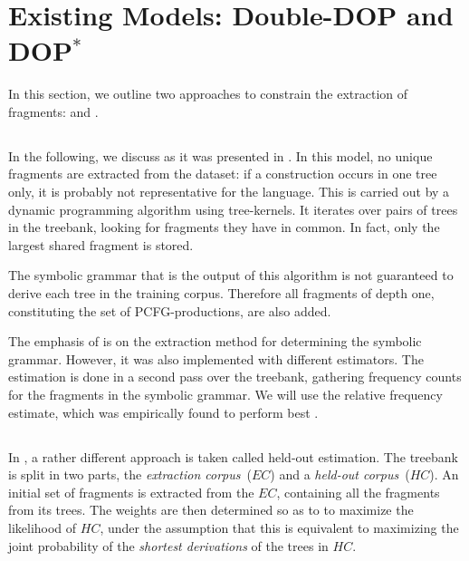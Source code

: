 
\section{Existing Models: Double-DOP and DOP$^*$}\label{sec:Existing}


In this section, we outline two approaches to constrain the extraction of fragments: \ddop{} and \dops{}. 

\subsection{\ddop}
In the following, we discuss \ddop{} as it was presented in \cite{sangati2011}. In this model, no unique fragments are extracted from the dataset: if a construction occurs in one tree only, it is probably not representative for the language. This is carried out by a dynamic programming algorithm using tree-kernels. It iterates over pairs of trees in the treebank, looking for fragments they have in common. In fact, only the largest shared fragment is stored. 

The symbolic grammar that is the output of this algorithm is not guaranteed to derive each tree in the training corpus. Therefore all fragments of depth one, constituting the set of PCFG-productions, are also added.

The emphasis of \ddop{} is on the extraction method for determining the symbolic grammar. However, it was also implemented with different estimators. The estimation is done in a second pass over the treebank, gathering frequency counts for the fragments in the symbolic grammar. We will use the relative frequency estimate, which was empirically found to perform best \cite{sangati2011}.

\subsection{\dops}
In \dops{} \cite{zollmann2005}, a rather different approach is taken called held-out estimation. The treebank is split in two parts, the \emph{extraction corpus}~($EC$) and a \emph{held-out corpus}~($HC$). An initial set of fragments is extracted from the $EC$, containing all the fragments from its trees. The weights are then determined so as to to maximize the likelihood of $HC$, under the assumption that this is equivalent to maximizing the joint probability of the \emph{shortest derivations} of the trees in $HC$. 


